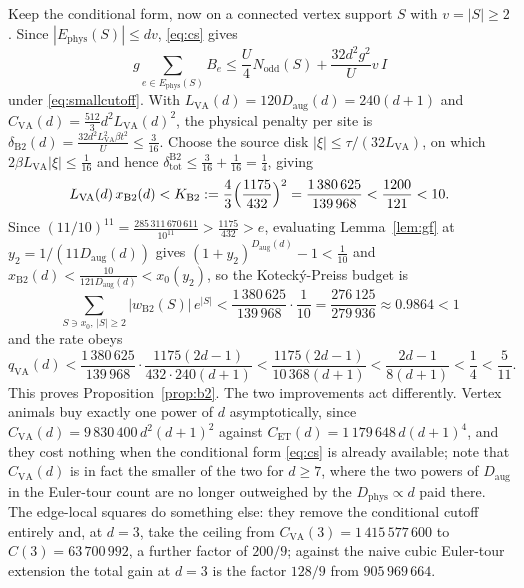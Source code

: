 \documentclass[11pt]{article}
\theoremstyle{plain}
\theoremstyle{definition}
\newcommand{\Nodd}{N_{\mathrm{odd}}}
\newcommand{\Dphys}{D_{\mathrm{phys}}}
\newcommand{\Daug}{D_{\mathrm{aug}}}
\begin{document}
Keep the conditional form, now on a connected vertex support $S$ with $v=|S|\ge2$.
Since $|E_{\mathrm{phys}}(S)|\le dv$, \eqref{eq:cs} gives
\[
 g\sum_{e\in E_{\mathrm{phys}}(S)}B_e\le\frac U4\Nodd(S)+\frac{32d^2g^2}{U}v\,I
\]
under \eqref{eq:smallcutoff}. With $L_{\mathrm{VA}}(d)=120\Daug(d)=240(d+1)$ and
$C_{\mathrm{VA}}(d)=\frac{512}{3}d^2L_{\mathrm{VA}}(d)^2$, the physical penalty per
site is $\delta_{\mathrm{B2}}(d)=\frac{32d^2L_{\mathrm{VA}}^2\beta t^2}{U}\le\frac{3}{16}$.
Choose the source disk $|\xi|\le\tau/(32L_{\mathrm{VA}})$, on which
$2\beta L_{\mathrm{VA}}|\xi|\le\frac1{16}$ and hence
$\delta_{\mathrm{tot}}^{\mathrm{B2}}\le\frac3{16}+\frac1{16}=\frac14$, giving
\begin{equation}\label{eq:b2K}
 L_{\mathrm{VA}}(d)\,x_{\mathrm{B2}}(d)<K_{\mathrm{B2}}:=\frac43\Bigl(\frac{1175}{432}\Bigr)^2
 =\frac{1\,380\,625}{139\,968}<\frac{1200}{121}<10 .
\end{equation}
Since $(11/10)^{11}=\frac{285\,311\,670\,611}{10^{11}}>\frac{1175}{432}>e$, evaluating
Lemma~\ref{lem:gf} at $y_2=1/(11\Daug(d))$ gives $(1+y_2)^{\Daug(d)}-1<\frac1{10}$ and
$x_{\mathrm{B2}}(d)<\frac{10}{121\Daug(d)}<x_0(y_2)$, so the Koteck\'y-Preiss budget is
\begin{equation}\label{eq:b2kp}
 \sum_{S\ni x_0,\,|S|\ge2}|w_{\mathrm{B2}}(S)|\,e^{|S|}
 <\frac{1\,380\,625}{139\,968}\cdot\frac1{10}=\frac{276\,125}{279\,936}\approx0.9864<1
\end{equation}
and the rate obeys
\begin{equation}\label{eq:b2q}
 q_{\mathrm{VA}}(d)<\frac{1\,380\,625}{139\,968}\cdot\frac{1175(2d-1)}{432\cdot240(d+1)}
 <\frac{1175(2d-1)}{10\,368(d+1)}<\frac{2d-1}{8(d+1)}<\frac14<\frac5{11} .
\end{equation}
This proves Proposition~\ref{prop:b2}. The two improvements act differently. Vertex
animals buy exactly one power of $d$ asymptotically, since
$C_{\mathrm{VA}}(d)=9\,830\,400\,d^2(d+1)^2$ against
$C_{\mathrm{ET}}(d)=1\,179\,648\,d(d+1)^4$, and they cost nothing when the conditional
form \eqref{eq:cs} is already available; note that $C_{\mathrm{VA}}(d)$ is in fact the
smaller of the two for $d\ge7$, where the two powers of $\Daug$ in the Euler-tour
count are no longer outweighed by the $\Dphys\propto d$ paid there. The edge-local
squares do something else: they remove the conditional cutoff entirely and, at $d=3$,
take the ceiling from $C_{\mathrm{VA}}(3)=1\,415\,577\,600$ to $C(3)=63\,700\,992$, a
further factor of $200/9$; against the naive cubic Euler-tour extension the total
gain at $d=3$ is the factor $128/9$ from $905\,969\,664$.
\end{document}
